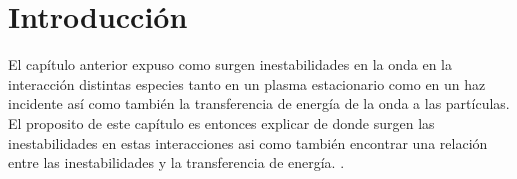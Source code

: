 \documentclass[../tesis_main_file.tex]{subfiles}
\begin{document}
\onlyinsubfile{\setcounter{chapter}{1}}
\section{Introducción}
El capítulo anterior expuso como surgen inestabilidades en la onda en la interacción distintas especies tanto en un plasma estacionario como en un haz incidente así como también la transferencia de energía de la onda a las partículas.\\
El proposito de este capítulo es entonces explicar de donde surgen las inestabilidades en estas interacciones asi como también encontrar una relación entre las inestabilidades y la transferencia de energía. \cite{bellan2008fundamentals}.\\
\end{document}
